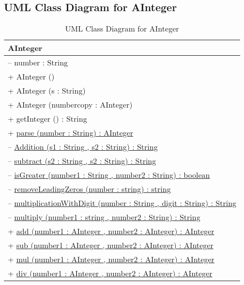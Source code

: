 \documentclass[a4paper,12pt]{article}
\begin{document}
\subsection{UML Class Diagram for AInteger}

\begin{table}[h!]
\centering
\begin{tabular}{|l|}
\hline
\textbf{AInteger}\\
\hline
-- number : String\\
\hline
+ AInteger () \\
+ AInteger (s : String) \\
+ AInteger (numbercopy : AInteger)\\
+ getInteger () : String \\
+ \underline{parse (number : String) : AInteger} \\
-- \underline{Addition (s1 : String , s2 : String) : String} \\
-- \underline{subtract (s2 : String , s2 : String) : String} \\
-- \underline{isGreater (number1 : String , number2 : String) : boolean }\\
-- \underline{removeLeadingZeros (number : string) : string} \\
-- \underline{multiplicationWithDigit (number : String , digit : String) : String} \\
-- \underline{multiply (number1 : string , number2 : String) : String} \\
+ \underline{add (number1 : AInteger , number2 : AInteger) : AInteger} \\
+ \underline{sub (number1 : AInteger , number2 : AInteger) : AInteger} \\
+ \underline{mul (number1 : AInteger , number2 : AInteger) : AInteger} \\
+ \underline{div (number1 : AInteger , number2 : AInteger) : AInteger} \\
\hline
\end{tabular}
\caption{UML Class Diagram for AInteger}
\end{table}
\end{document}
